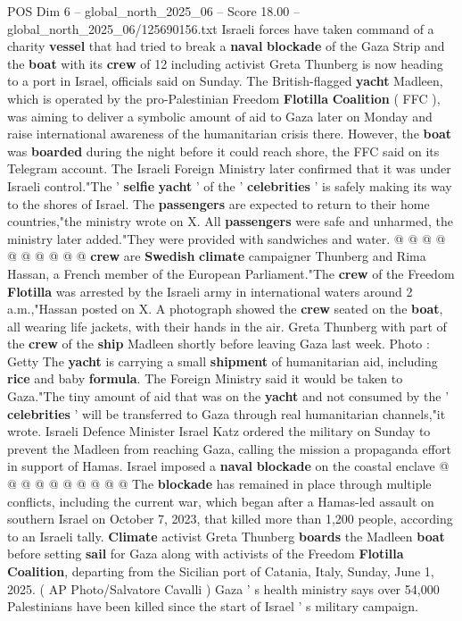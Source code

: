 \begin{textsample}{POS Dim 6 – global\_north\_2025\_06 – Score 18.00 – global\_north\_2025\_06/125690156.txt}  \label{ex:f6_pos_024}
Israeli forces have taken command of a charity \textbf{vessel} that had tried to break a \textbf{naval} \textbf{blockade} of the Gaza Strip and the \textbf{boat} with its \textbf{crew} of 12 including activist Greta Thunberg is now heading to a port in Israel, officials said on Sunday.
The British-flagged \textbf{yacht} Madleen, which is operated by the pro-Palestinian Freedom \textbf{Flotilla} \textbf{Coalition} ( FFC ), was aiming to deliver a symbolic amount of aid to Gaza later on Monday and raise international awareness of the humanitarian crisis there.
However, the \textbf{boat} was \textbf{boarded} during the night before it could reach shore, the FFC said on its Telegram account.
The Israeli Foreign Ministry later confirmed that it was under Israeli control."The ' \textbf{selfie} \textbf{yacht} ' of the ' \textbf{celebrities} ' is safely making its way to the shores of Israel.
The \textbf{passengers} are expected to return to their home countries,"the ministry wrote on X.
All \textbf{passengers} were safe and unharmed, the ministry later added."They were provided with sandwiches and water. @ @ @ @ @ @ @ @ @ @ \textbf{crew} are \textbf{Swedish} \textbf{climate} campaigner Thunberg and Rima Hassan, a French member of the European Parliament."The \textbf{crew} of the Freedom \textbf{Flotilla} was arrested by the Israeli army in international waters around 2 a.m.,"Hassan posted on X.
A photograph showed the \textbf{crew} seated on the \textbf{boat}, all wearing life jackets, with their hands in the air.
Greta Thunberg with part of the \textbf{crew} of the \textbf{ship} Madleen shortly before leaving Gaza last week.
Photo : Getty The \textbf{yacht} is carrying a small \textbf{shipment} of humanitarian aid, including \textbf{rice} and baby \textbf{formula}.
The Foreign Ministry said it would be taken to Gaza."The tiny amount of aid that was on the \textbf{yacht} and not consumed by the ' \textbf{celebrities} ' will be transferred to Gaza through real humanitarian channels,"it wrote.
Israeli Defence Minister Israel Katz ordered the military on Sunday to prevent the Madleen from reaching Gaza, calling the mission a propaganda effort in support of Hamas.
Israel imposed a \textbf{naval} \textbf{blockade} on the coastal enclave @ @ @ @ @ @ @ @ @ @ The \textbf{blockade} has remained in place through multiple conflicts, including the current war, which began after a Hamas-led assault on southern Israel on October 7, 2023, that killed more than 1,200 people, according to an Israeli tally. \textbf{Climate} activist Greta Thunberg \textbf{boards} the Madleen \textbf{boat} before setting \textbf{sail} for Gaza along with activists of the Freedom \textbf{Flotilla} \textbf{Coalition}, departing from the Sicilian port of Catania, Italy, Sunday, June 1, 2025. ( AP Photo/Salvatore Cavalli ) Gaza ' s health ministry says over 54,000 Palestinians have been killed since the start of Israel ' s military campaign.

\end{textsample}
